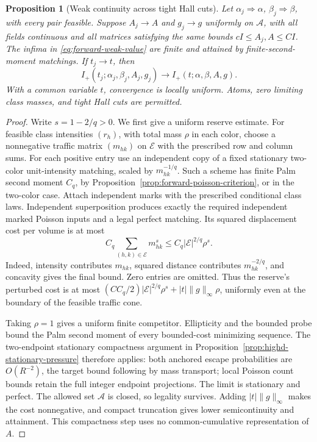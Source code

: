 \documentclass[11pt,reqno]{amsart}
\newtheorem{proposition}[theorem]{Proposition}
\theoremstyle{definition}
\theoremstyle{remark}
\numberwithin{equation}{section}
\begin{document}
\begin{proposition}[Weak continuity across tight Hall cuts]
\label{prop:forward-weak-continuity}
Let \(\alpha_j\Rightarrow\alpha\), \(\beta_j\Rightarrow\beta\),
with every pair feasible. Suppose \(A_j\to A\) and \(g_j\to g\)
uniformly on \(\mathcal A\), with all fields continuous and all
matrices satisfying the same bounds \(cI\le A_j,A\le CI\).
The infima in \eqref{eq:forward-weak-value} are finite and attained
by finite-second-moment matchings. If \(t_j\to t\), then
\[
 I_+(t_j;\alpha_j,\beta_j,A_j,g_j)
          \longrightarrow I_+(t;\alpha,\beta,A,g).
\]
With a common variable \(t\), convergence is locally uniform.
Atoms, zero limiting class masses, and tight Hall cuts are permitted.
\end{proposition}
\begin{proof}
Write \(s=1-2/q>0\). We first give a uniform reserve estimate.
For feasible class intensities \((r_h)\), with total mass \(\rho\)
in each color, choose a nonnegative traffic matrix \((m_{hk})\)
on \(\mathcal E\) with the prescribed row and column sums.
For each positive entry use an independent copy of a fixed stationary
two-color unit-intensity matching, scaled by \(m_{hk}^{-1/q}\).
Such a scheme has finite Palm second moment \(C_q\), by
Proposition~\ref{prop:forward-poisson-criterion}, or
\cite[Theorem~1(iii)]{AmirAngelHolroyd} in the two-color case.
Attach independent marks with the prescribed conditional class laws.
Independent superposition produces exactly the required independent
marked Poisson inputs and a legal perfect matching. Its squared
displacement cost per volume is at most
\begin{equation}
\label{eq:forward-weak-reserve}
 C_q\sum_{(h,k)\in\mathcal E}m_{hk}^{s}
       \le C_q|\mathcal E|^{2/q}\rho^s.
\end{equation}
Indeed, intensity contributes \(m_{hk}\), squared distance contributes
\(m_{hk}^{-2/q}\), and concavity gives the final bound.
Zero entries are omitted. Thus the reserve's perturbed cost is at most
\((C C_q/2)|\mathcal E|^{2/q}\rho^s+|t|\|g\|_\infty\rho\),
uniformly even at the boundary of the feasible traffic cone.

Taking \(\rho=1\) gives a uniform finite competitor. Ellipticity
and the bounded probe bound the Palm second moment of every
bounded-cost minimizing sequence. The two-endpoint stationary
compactness argument in Proposition~\ref{prop:highd-stationary-pressure}
therefore applies: both anchored escape probabilities are
\(O(R^{-2})\), the target bound following by mass transport;
local Poisson count bounds retain the full integer endpoint
projections. The limit is stationary and perfect. The allowed set
\(\mathcal A\) is closed, so legality survives. Adding
\(|t|\|g\|_\infty\) makes the cost nonnegative, and compact
truncation gives lower semicontinuity and attainment. This compactness
step uses no common-cumulative representation of \(A\).


\end{proof}
\end{document}
